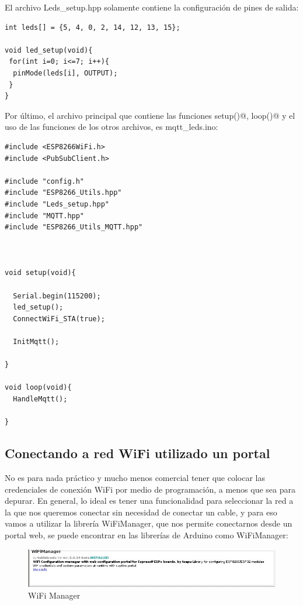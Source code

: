 \documentclass[oneside]{article}
\begin{document}
El archivo {\color{blue} Leds\_setup.hpp} solamente contiene la configuración de pines de salida:
\begin{lstlisting}[frame=single]
int leds[] = {5, 4, 0, 2, 14, 12, 13, 15};

void led_setup(void){
 for(int i=0; i<=7; i++){
  pinMode(leds[i], OUTPUT);
 }
}
\end{lstlisting}

Por último, el archivo principal que contiene las funciones \verb@void setup()@, \verb@void loop()@ y el uso de las funciones de los otros archivos, es {\color{blue} mqtt\_leds.ino}:
\begin{lstlisting}[frame=single]
#include <ESP8266WiFi.h>
#include <PubSubClient.h>

#include "config.h"
#include "ESP8266_Utils.hpp"
#include "Leds_setup.hpp"
#include "MQTT.hpp"
#include "ESP8266_Utils_MQTT.hpp"



void setup(void){
  
  Serial.begin(115200);
  led_setup();
  ConnectWiFi_STA(true);

  InitMqtt();
  
}

void loop(void){
  HandleMqtt();
  
}
\end{lstlisting}

\subsection*{Conectando a red WiFi utilizado un portal}
No es para nada práctico y mucho menos comercial tener que colocar las credenciales de conexión WiFi por medio de programación, a menos que sea para depurar. En general, lo ideal es tener una funcionalidad para seleccionar la red a la que nos queremos conectar sin necesidad de conectar un cable, y para eso vamos a utilizar la librería WiFiManager, que nos permite conectarnos desde un portal web, se puede encontrar en las librerías de Arduino como WiFiManager:

\begin{figure}[H]
\centering
\includegraphics[scale=.85]{images/wifi_manager.jpg}
\caption{WiFi Manager}
\end{figure}
\end{document}
